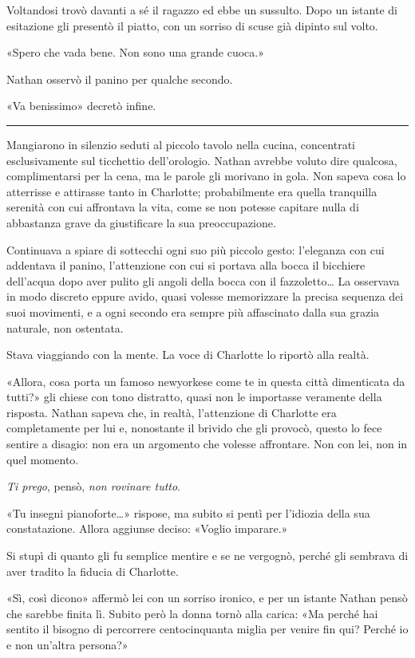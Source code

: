 \documentclass[a4paper,oneside,9pt]{memoir}
\begin{document}
Voltandosi trovò davanti a sé il ragazzo ed ebbe un sussulto. Dopo un istante di esitazione gli presentò il piatto,
con un sorriso di scuse già dipinto sul volto.

«Spero che vada bene. Non sono una grande cuoca.»

Nathan osservò il panino per qualche secondo.

«Va benissimo» decretò infine.

\plainbreak{1}

Mangiarono in silenzio seduti al piccolo tavolo nella cucina, concentrati esclusivamente sul ticchettio dell'orologio.
Nathan avrebbe voluto dire qualcosa, complimentarsi per la cena, ma le parole gli morivano in gola. Non sapeva cosa lo
atterrisse e attirasse tanto in Charlotte; probabilmente era quella tranquilla serenità con cui affrontava la vita,
come se non potesse capitare nulla di abbastanza grave da giustificare la sua preoccupazione.

Continuava a spiare di sottecchi ogni suo più piccolo gesto: l'eleganza con cui addentava il panino, l'attenzione con
cui si portava alla bocca il bicchiere dell'acqua dopo aver pulito gli angoli della bocca con il fazzoletto\dots{} La
osservava in modo discreto eppure avido, quasi volesse memorizzare la precisa sequenza dei suoi movimenti, e a ogni
secondo era sempre più affascinato dalla sua grazia naturale, non ostentata.

Stava viaggiando con la mente. La voce di Charlotte lo riportò alla realtà.

«Allora, cosa porta un famoso newyorkese come te in questa città dimenticata da tutti?» gli chiese con tono
distratto, quasi non le importasse veramente della risposta. Nathan sapeva che, in realtà, l'attenzione di Charlotte
era completamente per lui e, nonostante il brivido che gli provocò, questo lo fece sentire a disagio: non era un
argomento che volesse affrontare. Non con lei, non in quel momento.

\emph{Ti prego}, pensò, \emph{non rovinare tutto}.

«Tu insegni pianoforte\dots{}» rispose, ma subito si pentì per l'idiozia della sua constatazione. Allora aggiunse
deciso: «Voglio imparare.»

Si stupì di quanto gli fu semplice mentire e se ne vergognò, perché gli sembrava di aver tradito la fiducia di
Charlotte.

«Sì, così dicono» affermò lei con un sorriso ironico, e per un istante Nathan pensò che sarebbe finita lì. Subito
però la donna tornò alla carica: «Ma perché hai sentito il bisogno di percorrere centocinquanta miglia per venire
fin qui? Perché io e non un'altra persona?»
\end{document}
